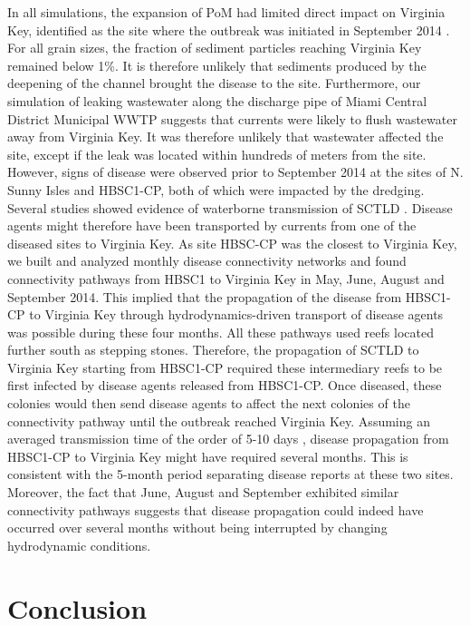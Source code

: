 \documentclass[preprint,12pt,authoryear]{elsarticle}
\begin{document}
In all simulations, the expansion of PoM had limited direct impact on Virginia Key, identified as the site where the outbreak was initiated in September 2014 \citep{precht2016unprecedented}. For all grain sizes, the fraction of sediment particles reaching Virginia Key remained below 1\%. It is therefore unlikely that sediments produced by the deepening of the channel brought the disease to the site. Furthermore, our simulation of leaking wastewater along the discharge pipe of Miami Central District Municipal WWTP suggests that currents were likely to flush wastewater away from Virginia Key. It was therefore unlikely that wastewater affected the site, except if the leak was located within hundreds of meters from the site. However, signs of disease were observed prior to September 2014 at the sites of N. Sunny Isles and HBSC1-CP, both of which were impacted by the dredging. Several studies showed evidence of waterborne transmission of SCTLD \citep{aeby2019pathogenesis,dobbelaere2020coupled,eaton2021measuring,meiling2021variable}. Disease agents might therefore have been transported by currents from one of the diseased sites to Virginia Key. As site HBSC-CP was the closest to Virginia Key, we built and analyzed monthly disease connectivity networks and found connectivity pathways from HBSC1 to Virginia Key in May, June, August and September 2014. This implied that the propagation of the disease from HBSC1-CP to Virginia Key through hydrodynamics-driven transport of disease agents was possible during these four months. All these pathways used reefs located further south as stepping stones. Therefore, the propagation of SCTLD to Virginia Key starting from HBSC1-CP required these intermediary reefs to be first infected by disease agents released from HBSC1-CP. Once diseased, these colonies would then send disease agents to affect the next colonies of the connectivity pathway until the outbreak reached Virginia Key. Assuming an averaged transmission time of the order of 5-10 days \citep{dobbelaere2020coupled}, disease propagation from HBSC1-CP to Virginia Key might have required several months. This is consistent with the 5-month period separating disease reports at these two sites. Moreover, the fact that June, August and September exhibited similar connectivity pathways suggests that disease propagation could indeed have occurred over several months without being interrupted by changing hydrodynamic conditions.

\section{Conclusion}
\end{document}
